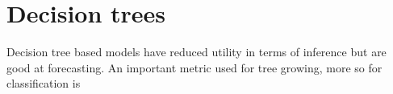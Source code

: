\chapter{Decision trees}

Decision tree based models have reduced utility in terms of inference but are good at forecasting. An important metric used for tree growing, more so for classification is
